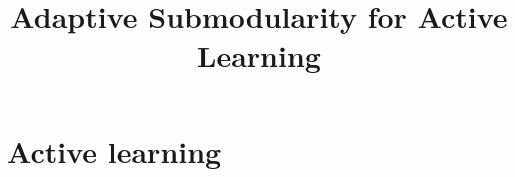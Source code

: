 \documentclass{article} %
\title{Adaptive Submodularity for Active Learning}
\begin{document}
\maketitle

\section{Active learning}




\end{document}
